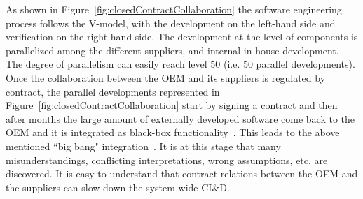 As shown in Figure~\ref{fig:closedContractCollaboration} the software engineering process follows the V-model, with the development on the left-hand side and verification on the right-hand side. The development at the level of components is parallelized among the different suppliers, and internal in-house development. The degree of parallelism can easily reach level 50 (i.e. 50 parallel developments). Once the collaboration between the OEM and its suppliers is regulated by contract, the parallel developments represented in Figure~\ref{fig:closedContractCollaboration} start by signing a contract and then after months the large amount of externally developed software come back to the OEM and it is integrated as black-box functionality~\cite{Broy:2006:CAS:1134285.1134292}. 
This leads to the above mentioned ``big bang" integration~\cite{Eklund2012}. %
It is at this stage that many misunderstandings, conflicting interpretations, wrong assumptions, etc. are discovered.
It is easy to understand that contract relations between the OEM and the suppliers can slow down the system-wide CI\&D.  %

%
%
%
%
